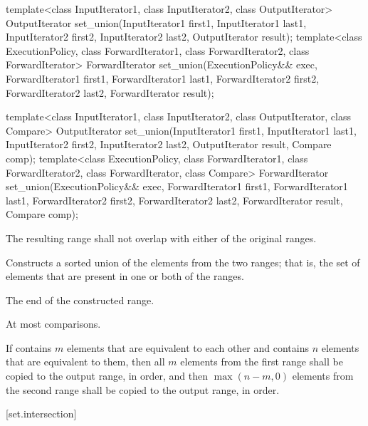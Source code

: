 %
\begin{itemdecl}
template<class InputIterator1, class InputIterator2,
         class OutputIterator>
  OutputIterator
    set_union(InputIterator1 first1, InputIterator1 last1,
              InputIterator2 first2, InputIterator2 last2,
              OutputIterator result);
template<class ExecutionPolicy, class ForwardIterator1, class ForwardIterator2,
         class ForwardIterator>
  ForwardIterator
    set_union(ExecutionPolicy&& exec,
              ForwardIterator1 first1, ForwardIterator1 last1,
              ForwardIterator2 first2, ForwardIterator2 last2,
              ForwardIterator result);

template<class InputIterator1, class InputIterator2,
         class OutputIterator, class Compare>
  OutputIterator
    set_union(InputIterator1 first1, InputIterator1 last1,
              InputIterator2 first2, InputIterator2 last2,
              OutputIterator result, Compare comp);
template<class ExecutionPolicy, class ForwardIterator1, class ForwardIterator2,
         class ForwardIterator, class Compare>
  ForwardIterator
    set_union(ExecutionPolicy&& exec,
              ForwardIterator1 first1, ForwardIterator1 last1,
              ForwardIterator2 first2, ForwardIterator2 last2,
              ForwardIterator result, Compare comp);
\end{itemdecl}

\begin{itemdescr}
\pnum
\requires
The resulting range shall not overlap with either of the original ranges.

\pnum
\effects
Constructs a sorted union of the elements from the two ranges;
that is, the set of elements that are present in one or both of the ranges.

\pnum
\returns
The end of the constructed range.

\pnum
\complexity
At most
comparisons.

\pnum
\remarks If  contains $m$ elements that are equivalent to
each other and  contains $n$ elements that are equivalent
to them, then all $m$ elements from the first range shall be copied to the output
range, in order, and then $\max(n - m, 0)$ elements from the second range shall
be copied to the output range, in order.
\end{itemdescr}

[set.intersection]{}

